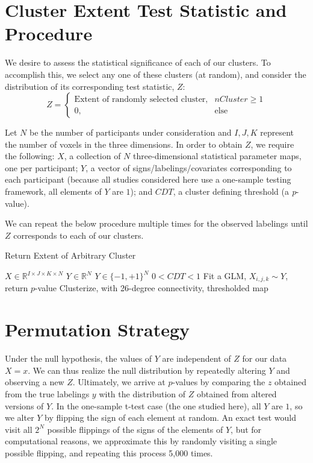 \documentclass{article}
\begin{document}
\section{Cluster Extent Test Statistic and Procedure}
We desire to assess the statistical significance of each of our clusters.
To accomplish this, we select any one of these clusters (at random), and consider the distribution of its corresponding test statistic, $Z$:
\begin{equation}
  Z = 
  \begin{cases}
    \text{Extent of randomly selected cluster}, & nCluster\geq1\\
    0, & \text{else}
  \end{cases}
\end{equation}


Let $N$ be the number of participants under consideration and $I, J, K$ represent the number of voxels in the three dimensions.
In order to obtain $Z$, we require the following: $X$, a collection of $N$ three-dimensional statistical parameter maps, one per participant; $Y$, a vector of signs/labelings/covariates corresponding to each participant (because all studies considered here use a one-sample testing framework, all elements of $Y$ are $1$); and $CDT$, a cluster defining threshold (a \textit{p}-value).

We can repeat the below procedure multiple times for the observed labelings until $Z$ corresponds to each of our clusters.

\begin{algorithm}[H]
  \caption{Return Extent of Arbitrary Cluster}
  \begin{algorithmic}[1]
    \REQUIRE $X \in \mathbb{R}^{I \times J \times K \times N}$
    \REQUIRE $Y \in \mathbb{R}^{N}$  $Y \in \{-1,+1\}^{N}$
    \REQUIRE $0 < CDT < 1$
    \STATE Fit a GLM, $X_{i,j,k} \sim Y$, return $p$-value
    \ELSE
    \ENDIF
    \ENDFOR
    \STATE Clusterize, with 26-degree connectivity, thresholded map
    \ELSE
    \ENDIF
  \end{algorithmic}
\end{algorithm}

\section{Permutation Strategy}
Under the null hypothesis, the values of $Y$ are independent of $Z$ for our data $X=x$.
We can thus realize the null distribution by repeatedly altering $Y$ and observing a new $Z$.
Ultimately, we arrive at $p$-values by comparing the $z$ obtained from the true labelings $y$ with the distribution of $Z$ obtained from altered versions of $Y$.
In the one-sample t-test case (the one studied here), all $Y$ are $1$, so we alter $Y$ by flipping the sign of each element at random.
An exact test would visit all $2^N$ possible flippings of the signs of the elements of $Y$, but for computational reasons, we approximate this by randomly visiting a single possible flipping, and repeating this process 5,000 times.
\end{document}
